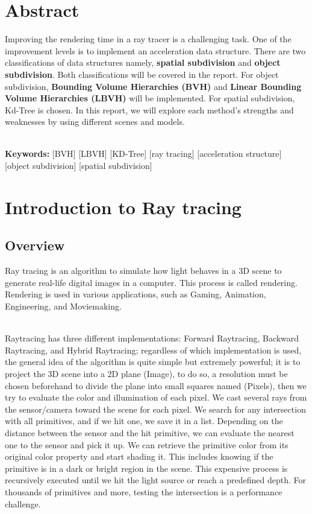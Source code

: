 \documentclass[11pt,a4paper]{article}
\begin{document}
\section*{Abstract}
Improving the rendering time in a ray tracer is a challenging task. One of the improvement levels is to implement an acceleration data structure. There are two classifications of data structures namely, \textbf{spatial subdivision} and \textbf{object subdivision}. Both classifications will be covered in the report. For object subdivision, \textbf{Bounding Volume Hierarchies (BVH)} and \textbf{Linear Bounding Volume Hierarchies (LBVH)} will be implemented. For spatial subdivision, Kd-Tree is chosen. In this report, we will explore each method's strengths and weaknesses by using different scenes and models.
  
\noindent
\\
\textbf{Keywords:} [BVH] [LBVH] [KD-Tree] [ray tracing] [acceleration structure]  [object subdivision] [spatial
subdivision] 
\clearpage
\tableofcontents
\clearpage



\section{Introduction to Ray tracing}
\subsection{Overview}
Ray tracing is an algorithm to simulate how light behaves in a 3D scene to generate real-life digital images in a computer. This process is called rendering. Rendering is used in various applications, such as Gaming, Animation, Engineering, and Moviemaking. 

\noindent
\\
Raytracing has three different implementations: Forward Raytracing, Backward Raytracing, and Hybrid Raytracing; regardless of which implementation is used, the general idea of the algorithm is quite simple but extremely powerful; it is to project the 3D scene into a 2D plane (Image), to do so, a resolution must be chosen beforehand to divide the plane into small squares named (Pixels), then we try to evaluate the color and illumination of each pixel. We cast several rays from the sensor/camera toward the scene for each pixel. We search for any intersection with all primitives, and if we hit one, we save it in a list. Depending on the distance between the sensor and the hit primitive, we can evaluate the nearest one to the sensor and pick it up. We can retrieve the primitive color from its original color property and start shading it. This includes knowing if the primitive is in a dark or bright region in the scene. This expensive process is recursively executed until we hit the light source or reach a predefined depth. For thousands of primitives and more, testing the intersection is a performance challenge.
\end{document}
